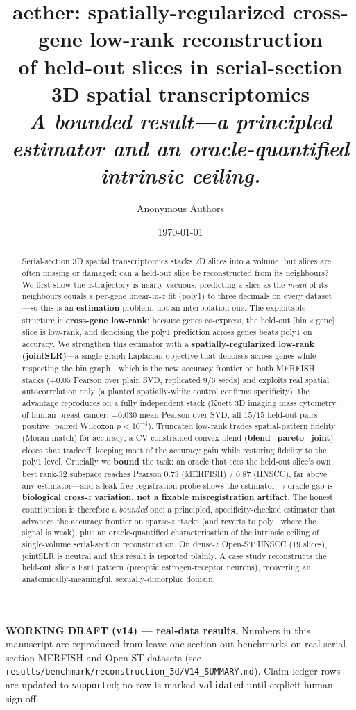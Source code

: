 \documentclass[10pt,letterpaper]{article}
\title{aether: spatially-regularized cross-gene low-rank reconstruction\\
of held-out slices in serial-section 3D spatial transcriptomics\\[0.4em]
\large\itshape A bounded result---a principled estimator and an oracle-quantified intrinsic ceiling.}
\author[1]{Anonymous Authors}
\affil[1]{Author affiliations to be added before submission}
\date{\today}
\newcommand{\draftbanner}{%
  \begin{center}\colorbox{aetSky!20}{\parbox{0.9\textwidth}{%
  \textbf{WORKING DRAFT (v14) --- real-data results.} Numbers in this manuscript
  are reproduced from leave-one-section-out benchmarks on real serial-section
  MERFISH and Open-ST datasets (see \texttt{results/benchmark/reconstruction\_3d/V14\_SUMMARY.md}).
  Claim-ledger rows are updated to \texttt{supported}; no row is marked \texttt{validated}
  until explicit human sign-off.
  }}\end{center}}
\begin{document}
\maketitle
\linenumbers
\draftbanner

\begin{abstract}
Serial-section 3D spatial transcriptomics stacks 2D slices into a volume, but slices are
often missing or damaged; can a held-out slice be reconstructed from its neighbours?
We first show the $z$-trajectory is nearly vacuous: predicting a slice as the \emph{mean}
of its neighbours equals a per-gene linear-in-$z$ fit (poly1) to three decimals on every
dataset---so this is an \textbf{estimation} problem, not an interpolation one.
The exploitable structure is \textbf{cross-gene low-rank}: because genes co-express, the
held-out [bin\,$\times$\,gene] slice is low-rank, and denoising the poly1 prediction across
genes beats poly1 on accuracy.
We strengthen this estimator with a \textbf{spatially-regularized low-rank (jointSLR)}---a
single graph-Laplacian objective that denoises across genes while respecting the bin
graph---which is the new accuracy frontier on both MERFISH stacks ($+0.05$ Pearson over
plain SVD, replicated 9/6 seeds) and exploits real spatial autocorrelation only (a planted
spatially-white control confirms specificity); the advantage reproduces on a fully
independent stack (Kuett 3D imaging mass cytometry of human breast cancer: $+0.030$ mean
Pearson over SVD, all $15/15$ held-out pairs positive, paired Wilcoxon $p{<}10^{-4}$).
Truncated low-rank trades spatial-pattern fidelity (Moran-match) for accuracy; a
CV-constrained convex blend (\textbf{blend\_pareto\_joint}) closes that tradeoff, keeping
most of the accuracy gain while restoring fidelity to the poly1 level.
Crucially we \textbf{bound} the task: an oracle that sees the held-out slice's own best
rank-32 subspace reaches Pearson $0.73$ (MERFISH) / $0.87$ (HNSCC), far above any
estimator---and a leak-free registration probe shows the estimator$\to$oracle gap is
\textbf{biological cross-$z$ variation, not a fixable misregistration artifact}.
The honest contribution is therefore a \emph{bounded} one: a principled,
specificity-checked estimator that advances the accuracy frontier on sparse-$z$ stacks (and
reverts to poly1 where the signal is weak), plus an oracle-quantified characterisation of
the intrinsic ceiling of single-volume serial-section reconstruction.
On dense-$z$ Open-ST HNSCC (19 slices), jointSLR is neutral and this result is
reported plainly.
A case study reconstructs the held-out slice's Esr1 pattern (preoptic
estrogen-receptor neurons), recovering an anatomically-meaningful, sexually-dimorphic domain.
\end{abstract}
\end{document}

